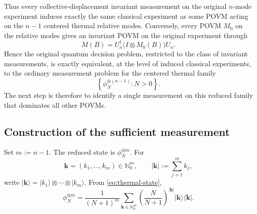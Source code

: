 \documentclass{article}
\theoremstyle{named}
\theoremstyle{named1}
\newcommand{\N}{\mathbb{N}}
\newcommand{\bm}{\mathbf}
\theoremstyle{plain}
\theoremstyle{remark}
\begin{document}
Thus every collective-displacement invariant measurement on the original
$n$-mode experiment induces exactly the same classical experiment as some
POVM acting on the $n-1$ centered thermal relative modes. Conversely, every
POVM $M_0$ on the relative modes gives an invariant POVM on the original
experiment through
\[
    M(B)
    =
    U_n^\dagger
    \bigl(I\otimes M_0(B)\bigr)
    U_n.
\]
Hence the original quantum decision problem, restricted to the class of invariant measurements, is
exactly equivalent, at the level of induced classical experiments, to the
ordinary measurement problem for the centered thermal family
\[
    \left\{
        \phi_N^{\otimes(n-1)}
        :
        N>0
    \right\}.
\]
The next step is therefore to identify a single measurement on this reduced
family that dominates all other POVMs.









\subsection{Construction of the sufficient measurement}
\label{subsec:number-sufficiency}

Set
$m:=n-1$.
The reduced state is
$\phi_N^{\otimes m} $.
For
\[
    \bm k=(k_1,\ldots,k_m)\in\N_0^m,
\qquad
    |\bm k|
    :=
    \sum_{j=1}^m k_j,
\] write
$ |\bm k\rangle
    =
    |k_1\rangle\otimes\cdots\otimes|k_m\rangle.
$
From \eqref{eq:thermal-state},
\begin{equation}
    \phi_N^{\otimes m}
    =
    \frac{1}{(N+1)^m}
    \sum_{\bm k\in\N_0^m}
    \left(
        \frac{N}{N+1}
    \right)^{|\bm k|}
    |\bm k\rangle\langle\bm k|.
    \label{eq:thermal-product}
\end{equation}
\end{document}
